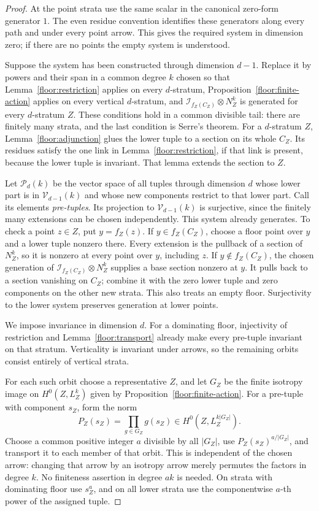 \begin{proof}
At the point strata use the same scalar in the canonical zero-form
generator \(1\).  The even residue convention identifies these generators
along every path and under every point arrow.  This gives the required
system in dimension zero; if there are no points the empty system is
understood.

Suppose the system has been constructed through dimension \(d-1\).
Replace it by powers and their span in a common degree \(k\) chosen so that
Lemma~\ref{floor:restriction} applies on
every \(d\)-stratum, Proposition~\ref{floor:finite-action} applies on every
vertical \(d\)-stratum, and
\(\mathcal I_{f_Z(C_Z)}\otimes N_Z^k\) is generated for every
\(d\)-stratum \(Z\).  These conditions hold in a common divisible tail:
there are finitely many strata, and the last condition is Serre's theorem.
For a \(d\)-stratum \(Z\), Lemma~\ref{floor:adjunction} glues
the lower tuple to a section on its whole \(C_Z\).  Its residues satisfy
the one link in Lemma~\ref{floor:restriction}, if that link is present,
because the lower tuple is invariant.  That lemma extends the section to
\(Z\).

Let \(\mathcal P_d(k)\) be the vector space of all tuples through
dimension \(d\) whose lower part is in \(\mathcal V_{d-1}(k)\) and whose
new components restrict to that lower part.  Call its elements
\emph{pre-tuples}.  Its projection to
\(\mathcal V_{d-1}(k)\) is surjective, since the finitely many extensions
can be chosen independently.  This system already generates.  To check a
point \(z\in Z\), put \(y=f_Z(z)\).  If \(y\in f_Z(C_Z)\), choose a
floor point over \(y\) and a lower tuple nonzero there.  Every extension is
the pullback of a section of \(N_Z^k\), so it is nonzero at every point
over \(y\), including \(z\).  If \(y\notin f_Z(C_Z)\), the chosen generation
of \(\mathcal I_{f_Z(C_Z)}\otimes N_Z^k\) supplies a base section nonzero
at \(y\).  It pulls back to a section
vanishing on \(C_Z\); combine it with the zero lower tuple and zero
components on the other new strata.  This also treats an empty floor.
Surjectivity to the lower system preserves generation at lower points.

We impose invariance in dimension \(d\).  For a dominating floor,
injectivity of restriction and Lemma~\ref{floor:transport} already make
every pre-tuple invariant on that stratum.
Verticality is invariant under arrows, so the remaining orbits consist
entirely of vertical strata.

For each such orbit choose a representative \(Z\), and let \(G_Z\) be
the finite isotropy image on \(H^0(Z,L_Z^k)\) given by
Proposition~\ref{floor:finite-action}.  For a pre-tuple with component
\(s_Z\), form the norm
\[
 P_Z(s_Z)=\prod_{g\in G_Z}g(s_Z)
       \in H^0(Z,L_Z^{k|G_Z|}).
\]
Choose a common positive integer \(a\) divisible by all \(|G_Z|\), use
\(P_Z(s_Z)^{a/|G_Z|}\), and transport it to each member of that orbit.
This is independent of the chosen arrow: changing that arrow by an
isotropy arrow merely permutes the factors in degree \(k\).  No finiteness
assertion in degree \(ak\) is needed.  On strata with dominating floor
use \(s_Z^a\), and on all lower strata use the componentwise \(a\)-th
power of the assigned tuple.


\end{proof}
